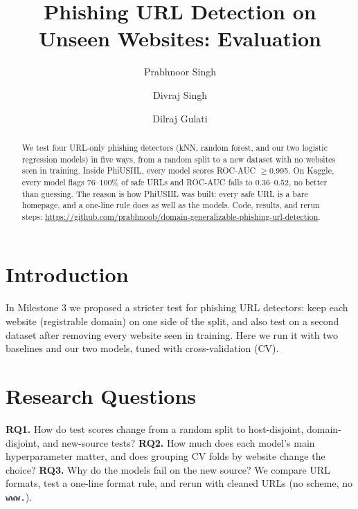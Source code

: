 \documentclass[sigconf,nonacm]{acmart}
\begin{document}
\title{Phishing URL Detection on Unseen Websites: Evaluation}
\author{Prabhnoor Singh}
\author{Divraj Singh}
\author{Dilraj Gulati}
\begin{abstract}
We test four URL-only phishing detectors (kNN, random forest, and our two logistic regression models) in five ways, from a random split to a new dataset with no websites seen in training. Inside PhiUSIIL, every model scores ROC-AUC $\ge$0.995. On Kaggle, every model flags 76--100\% of safe URLs and ROC-AUC falls to 0.36--0.52, no better than guessing. The reason is how PhiUSIIL was built: every safe URL is a bare homepage, and a one-line rule does as well as the models. Code, results, and rerun steps: \url{https://github.com/prabhnoob/domain-generalizable-phishing-url-detection}.
\end{abstract}
\maketitle

\section{Introduction}
In Milestone 3 we proposed a stricter test for phishing URL detectors: keep each website (registrable domain) on one side of the split, and also test on a second dataset after removing every website seen in training. Here we run it with two baselines and our two models, tuned with cross-validation (CV).

\section{Research Questions}
\textbf{RQ1.} How do test scores change from a random split to host-disjoint, domain-disjoint, and new-source tests?
\textbf{RQ2.} How much does each model's main hyperparameter matter, and does grouping CV folds by website change the choice?
\textbf{RQ3.} Why do the models fail on the new source? We compare URL formats, test a one-line format rule, and rerun with cleaned URLs (no scheme, no \texttt{www.}).
\end{document}
